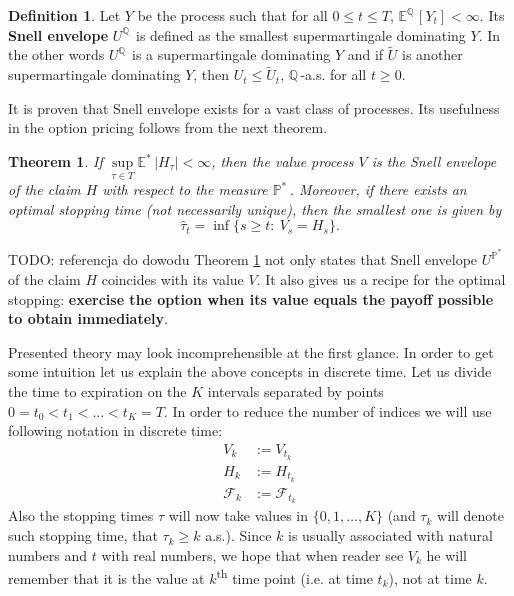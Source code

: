 \documentclass[a4paper,11pt, twoside]{book}
\newtheorem{thm}{Theorem}[chapter]
\theoremstyle{definition}
\newtheorem{mydef}{Definition}[chapter]
\theoremstyle{remark}
\def\E{{\mathbb{E}}}
\def\Q{{\mathbb{Q}}\,}
\def\Em{{\mathbb{E}^*}\,}
\def\Pm{{\mathbb{P}}^*\,}
\begin{document}
\begin{mydef}
 Let $Y$ be the process such that for all $0 \leq t \leq T$, $\E^{\Q}[Y_t] < \infty$. Its \textbf{Snell envelope} $U^{\Q}$ is defined as the smallest supermartingale dominating $Y$. In the other words $U^{\Q}$ is a supermartingale dominating $Y$ and if $\tilde{U}$ is another supermartingale dominating $Y$, then $U_t \leq \tilde{U}_t$, $\Q$-a.s. for all $t \geq 0$.
\end{mydef}
It is proven that Snell envelope exists for a vast class of processes. Its usefulness in the option pricing follows from the next theorem.
\begin{thm}
 \label{thm:snell}
 If $\sup\limits_{\tau \in T} \Em|H_{\tau}| < \infty$, then the value process $V$ is the Snell envelope of the claim $H$ with respect to the measure $\Pm$. Moreover, if there exists an optimal stopping time (not necessarily unique), then the smallest one is given by
 \begin{equation}
  \label{eq:optStop}
  \hat{\tau}_t = \inf\{ s \geq t:\ V_s = H_s \}.
 \end{equation}
\end{thm}
{\LARGE \color{red} TODO: referencja do dowodu}
Theorem \ref{thm:snell} not only states that Snell envelope $U^{\Pm}$ of the claim $H$ coincides with its value $V$. It also gives us a recipe for the optimal stopping: \textbf{exercise the option when its value equals the payoff possible to obtain immediately}.

Presented theory may look incomprehensible at the first glance. In order to get some intuition let us explain the above concepts in discrete time. Let us divide the time to expiration on the $K$ intervals separated by points $0 = t_0 < t_1 < \ldots < t_K = T$. In order to reduce the number of indices we will use following notation in discrete time:
\begin{align*}
 V_k &:= V_{t_k} \\
 H_k &:= H_{t_k} \\
 \mathcal{F}_k &:= \mathcal{F}_{t_k}
\end{align*}
Also the stopping times $\tau$ will now take values in $\{0, 1, \ldots, K\}$ (and $\tau_k$ will denote such stopping time, that $\tau_k \geq k$ a.s.).
Since $k$ is usually associated with natural numbers and $t$ with real numbers, we hope that when reader see $V_k$ he will remember that it is the value at $k$\textsuperscript{th} time point (i.e. at time $t_k$), not at time $k$.
\end{document}
